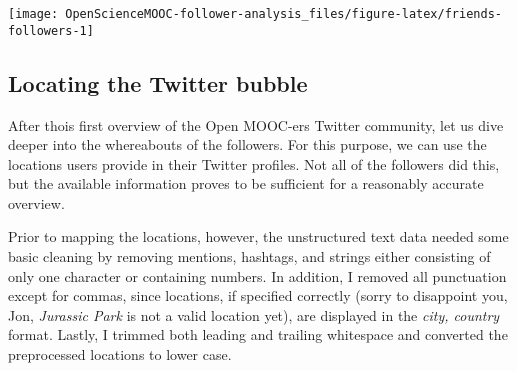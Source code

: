 \documentclass[]{article}
\begin{document}
\begin{center}\texttt{[image: OpenScienceMOOC-follower-analysis\_files/figure-latex/friends-followers-1]} \end{center}

\subsection{Locating the Twitter
bubble}\label{locating-the-twitter-bubble}

After thois first overview of the Open MOOC-ers Twitter community, let
us dive deeper into the whereabouts of the followers. For this purpose,
we can use the locations users provide in their Twitter profiles. Not
all of the followers did this, but the available information proves to
be sufficient for a reasonably accurate overview.

Prior to mapping the locations, however, the unstructured text data
needed some basic cleaning by removing mentions, hashtags, and strings
either consisting of only one character or containing numbers. In
addition, I removed all punctuation except for commas, since locations,
if specified correctly (sorry to disappoint you, Jon, \emph{Jurassic
Park} is not a valid location yet), are displayed in the \emph{city,
country} format. Lastly, I trimmed both leading and trailing whitespace
and converted the preprocessed locations to lower case.
\end{document}
